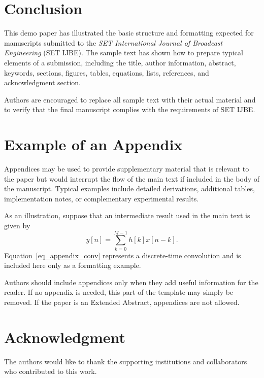 \documentclass[journal]{IEEEtran}
\begin{document}
\section{Conclusion}
This demo paper has illustrated the basic structure and formatting expected for manuscripts submitted to the \textit{SET International Journal of Broadcast Engineering} (SET IJBE). The sample text has shown how to prepare typical elements of a submission, including the title, author information, abstract, keywords, sections, figures, tables, equations, lists, references, and acknowledgment section.

Authors are encouraged to replace all sample text with their actual material and to verify that the final manuscript complies with the requirements of SET IJBE.

\appendices
\section{Example of an Appendix}
Appendices may be used to provide supplementary material that is relevant to the paper but would interrupt the flow of the main text if included in the body of the manuscript. Typical examples include detailed derivations, additional tables, implementation notes, or complementary experimental results.

As an illustration, suppose that an intermediate result used in the main text is given by
\begin{equation}
y[n] = \sum_{k=0}^{M-1} h[k]x[n-k].
\label{eq_appendix_conv}
\end{equation}
Equation~\eqref{eq_appendix_conv} represents a discrete-time convolution and is included here only as a formatting example.

Authors should include appendices only when they add useful information for the reader. If no appendix is needed, this part of the template may simply be removed. If the paper is an Extended Abstract, appendices are not allowed.

\section*{Acknowledgment}
The authors would like to thank the supporting institutions and collaborators who contributed to this work.

\end{document}
